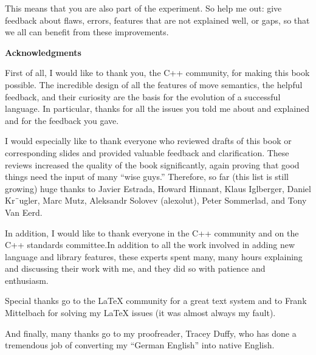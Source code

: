 This means that you are also part of the experiment. So help me out: give feedback about flaws, errors, features that are not explained well, or gaps, so that we all can benefit from these improvements.\par

\hspace*{\fill} \par %
\textbf{Acknowledgments}

First of all, I would like to thank you, the C++ community, for making this book possible. The incredible design of all the features of move semantics, the helpful feedback, and their curiosity are the basis for the evolution of a successful language. In particular, thanks for all the issues you told me about and explained and for the feedback you gave.\par

I would especially like to thank everyone who reviewed drafts of this book or corresponding slides and provided valuable feedback and clarification. These reviews increased the quality of the book significantly, again proving that good things need the input of many “wise guys.” Therefore, so far (this list is still growing) huge thanks to Javier Estrada, Howard Hinnant, Klaus Iglberger, Daniel Kr¨ugler, Marc Mutz, Aleksandr Solovev (alexolut), Peter Sommerlad, and Tony Van Eerd.\par

In addition, I would like to thank everyone in the C++ community and on the C++ standards committee.In addition to all the work involved in adding new language and library features, these experts spent many, many hours explaining and discussing their work with me, and they did so with patience and enthusiasm.\par

Special thanks go to the LaTeX community for a great text system and to Frank Mittelbach for solving my \LaTeX\xspace issues (it was almost always my fault).\par

And finally, many thanks go to my proofreader, Tracey Duffy, who has done a tremendous job of converting my “German English” into native English.\par

\newpage
















